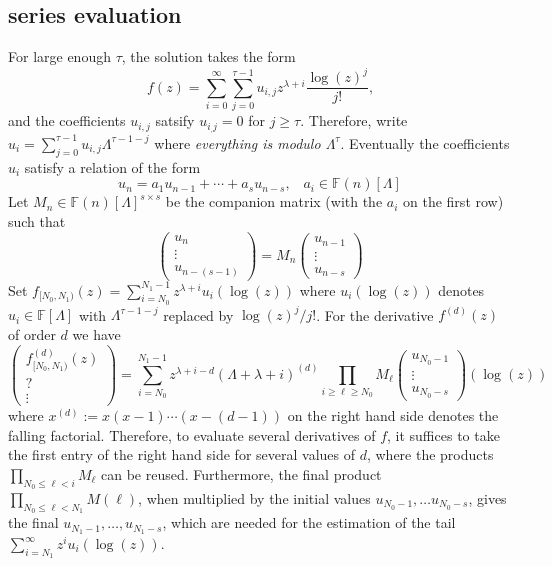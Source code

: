 \documentclass[12pt]{article}
\numberwithin{equation}{section}
\begin{document}
\subsection{series evaluation}

For large enough $\tau$, the solution takes the form
\begin{equation*}
f(z) = \sum_{i=0}^{\infty} \sum_{j=0}^{\tau-1} u_{i,j} z^{\lambda+i} \frac{\log(z)^j}{j!}\text{,}
\end{equation*}
and the coefficients $u_{i,j}$ satsify $u_{i_,j} = 0$ for $j \ge \tau$. Therefore, write $u_i = \sum_{j=0}^{\tau-1} u_{i,j} \Lambda^{\tau-1-j}$ where \emph{everything is modulo $\Lambda^\tau$}.
Eventually the coefficients $u_{i}$ satisfy a relation of the form
\begin{equation}
\label{unrec}
u_n = a_1 u_{n-1} + \cdots + a_s u_{n-s}\text{,} \quad a_i \in \mathbb{F}(n)[\Lambda]
\end{equation}
Let $M_n \in \mathbb{F}(n)[\Lambda] ^{s \times s}$ be the companion matrix (with the $a_i$ on the first row) such that
\begin{equation*}
\left(\begin{array}{c}
u_n\\
\vdots \\
u_{n-(s-1)}
\end{array}\right)
=M_n
\left(\begin{array}{c}
u_{n-1}\\
\vdots \\
u_{n-s}
\end{array}\right)
\end{equation*}
Set $f_{[N_0,N_1)}(z) = \sum_{i=N_0}^{N_1-1} z^{\lambda+i} u_i(\log(z))$ where $u_i(\log(z))$ denotes $u_i \in \mathbb{F}[\Lambda]$ with $\Lambda^{\tau-1-j}$ replaced by $\log(z)^j/j!$.
For the derivative $f^{(d)}(z)$ of order $d$ we have
\begin{equation*}
\left(\begin{array}{c}
f_{[N_0,N_1)}^{(d)}(z) \\
? \\
\vdots
\end{array}\right) = \sum_{i=N_0}^{N_1-1} z^{\lambda+i-d} (\Lambda+\lambda+i)^{(d)}\prod_{i\ge \ell \ge N_0}M_{\ell}
\left(\begin{array}{c}
u_{N_0-1}\\
\vdots \\
u_{N_0-s}
\end{array}\right) (\log(z))\end{equation*}
where $x^{(d)} := x(x-1)\cdots(x-(d-1))$ on the right hand side denotes the falling factorial. Therefore, to evaluate several derivatives of $f$, it suffices to take the first entry of the right hand side for several values of $d$, where the products $\prod_{N_0\le \ell < i}M_{\ell}$ can be reused. Furthermore, the final product $\prod_{N_0\le \ell < N_1}M(\ell)$, when multiplied by the initial values $u_{N_0-1}, \dots u_{N_0-s}$, gives the final $u_{N_1-1}, \dots, u_{N_1-s}$, which are needed for the estimation of the tail $\sum_{i=N_1}^{\infty} z^i u_i(\log(z))$.
\end{document}
